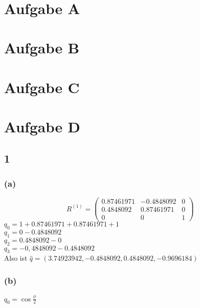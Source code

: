 \documentclass{../Vorlage/mat}
\begin{document}
 \\

\section*{Aufgabe A}


\section*{Aufgabe B}


\section*{Aufgabe C}


\section*{Aufgabe D}
\subsection*{1}
\subsubsection*{(a)}
\begin{equation}
	R^{(1)} = \begin{pmatrix}
	0.87461971 & -0.4848092 & 0 \\
	0.4848092 & 0.87461971 & 0\\
	0&0&1
	\end{pmatrix}
\end{equation}
$q_0 = 1 + 0.87461971 + 0.87461971 + 1$\\
$q_1 = 0 - 0.4848092$\\
$q_2 = 0.4848092 - 0$\\
$q_3 = -0,4848092 - 0.4848092$\\
Also ist $\hat{q} = (3.74923942, -0.4848092, 0.4848092, -0.9696184)$
\subsubsection*{(b)}
$q_0 = \cos{\frac{\phi}{2}}$
\end{document}
